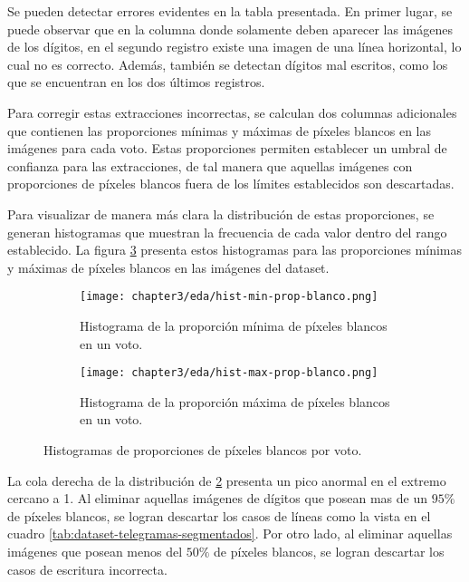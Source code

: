 Se pueden detectar errores evidentes en la tabla presentada. En primer lugar, se puede observar que en la columna donde
solamente deben aparecer las imágenes de los dígitos, en el segundo registro existe una imagen de una línea horizontal,
lo cual no es correcto. Además, también se detectan dígitos mal escritos, como los que se encuentran en los dos últimos
registros.

Para corregir estas extracciones incorrectas, se calculan dos columnas adicionales que contienen las proporciones
mínimas y máximas de píxeles blancos en las imágenes para cada voto. Estas proporciones permiten establecer un umbral
de confianza para las extracciones, de tal manera que aquellas imágenes con proporciones de píxeles blancos fuera de
los límites establecidos son descartadas.

Para visualizar de manera más clara la distribución de estas proporciones, se generan histogramas que muestran la
frecuencia de cada valor dentro del rango establecido. La figura \ref{fig:histogramas-min-max-prop-blanco} presenta
estos histogramas para las proporciones mínimas y máximas de píxeles blancos en las imágenes del dataset.

\begin{figure}[H]
    \centering
    \begin{subfigure}[h]{0.48\textwidth}
        \texttt{[image: chapter3/eda/hist-min-prop-blanco.png]}
        \caption{Histograma de la proporción mínima de píxeles blancos en un voto.}
        \label{fig:histograma-min-prop-blanco}
    \end{subfigure}
    \hfill
    \begin{subfigure}[h]{0.48\textwidth}
        \texttt{[image: chapter3/eda/hist-max-prop-blanco.png]}
        \caption{Histograma de la proporción máxima de píxeles blancos en un voto.}
        \label{fig:histograma-max-prop-blanco}
    \end{subfigure}
    \caption{Histogramas de proporciones de píxeles blancos por voto.}
    \label{fig:histogramas-min-max-prop-blanco}
\end{figure}

La cola derecha de la distribución de \ref{fig:histograma-max-prop-blanco} presenta un pico anormal en el extremo
cercano a 1. Al eliminar aquellas imágenes de dígitos que posean mas de un $95\%$ de píxeles blancos, se logran
descartar los casos de líneas como la vista en el cuadro \ref{tab:dataset-telegramas-segmentados}. Por otro lado, al
eliminar aquellas imágenes que posean menos del $50\%$ de píxeles blancos, se logran descartar los casos de escritura
incorrecta.


